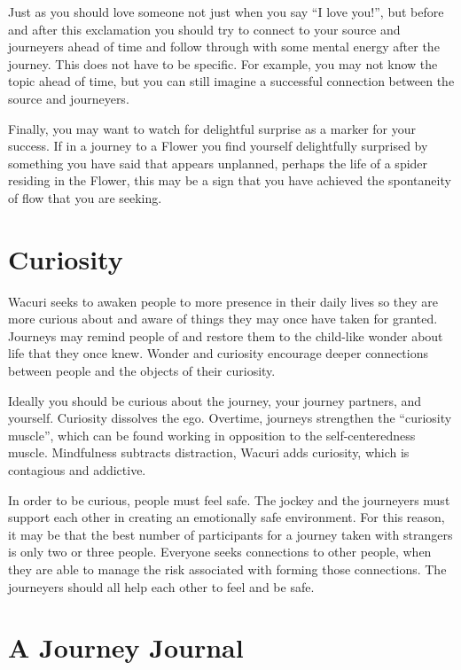 \documentclass[12pt]{book}
\begin{document}
					
Just as you should love someone not just when you say ``I love you!'', but before and after this exclamation you should try to connect to your source and journeyers ahead of time and follow through with some mental energy after the journey. This does not have to be specific. For example, you may not know the topic ahead of time, but you can still imagine a successful connection between the source and journeyers.
					
Finally, you may want to watch for delightful surprise as a marker for your success. If in a journey to a Flower you find yourself delightfully surprised by something you have said that appears unplanned, perhaps the life of a spider residing in the Flower, this may be a sign that you have achieved the spontaneity of flow that you are seeking.
				
			
\chapter{Curiosity}

Wacuri seeks to awaken people to more presence in their daily lives so they are more curious about and aware of things they may once have taken for granted. Journeys may remind people of and restore them to the child-like wonder about life that they once knew. Wonder and curiosity encourage deeper connections between people and the objects of their curiosity.
					
Ideally you should be curious about the journey, your journey partners, and yourself. Curiosity dissolves the ego. Overtime, journeys strengthen the “curiosity muscle”, which can be found working in opposition to the self-centeredness muscle. Mindfulness subtracts distraction, Wacuri adds curiosity, which is contagious and addictive.
					
In order to be curious, people must feel safe. The jockey and the journeyers must support each other in creating an emotionally safe environment. For this reason, it may be that the best number of participants for a journey taken with strangers is only two or three people. Everyone seeks connections to other people, when they are able to manage the risk associated with forming those connections. The journeyers should all help each other to feel and be safe.


\chapter{A Journey Journal}
\end{document}
